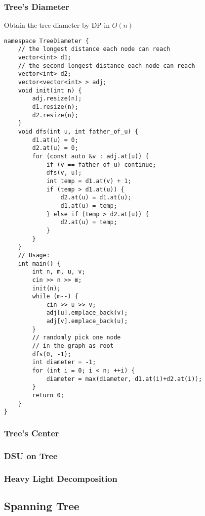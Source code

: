 \documentclass[10pt]{article}{\twocolumn}
\begin{document}
\subsubsection{Tree's Diameter}
Obtain the tree diameter by DP in $O(n)$
\begin{lstlisting}
namespace TreeDiameter {
    // the longest distance each node can reach
    vector<int> d1;
    // the second longest distance each node can reach
    vector<int> d2;
    vector<vector<int> > adj;
    void init(int n) {
        adj.resize(n);
        d1.resize(n);
        d2.resize(n);
    }
    void dfs(int u, int father_of_u) {
        d1.at(u) = 0;
        d2.at(u) = 0;
        for (const auto &v : adj.at(u)) {
            if (v == father_of_u) continue;
            dfs(v, u);
            int temp = d1.at(v) + 1;
            if (temp > d1.at(u)) {
                d2.at(u) = d1.at(u);
                d1.at(u) = temp;
            } else if (temp > d2.at(u)) {
                d2.at(u) = temp;
            }
        }
    }
    // Usage:
    int main() {
        int n, m, u, v;
        cin >> n >> m;
        init(n);
        while (m--) {
            cin >> u >> v;
            adj[u].emplace_back(v);
            adj[v].emplace_back(u);
        }
        // randomly pick one node 
        // in the graph as root
        dfs(0, -1);
        int diameter = -1;
        for (int i = 0; i < n; ++i) {
            diameter = max(diameter, d1.at(i)+d2.at(i));
        }
        return 0;
    }
}
\end{lstlisting}

\subsubsection{Tree's Center}

\subsubsection{DSU on Tree}

\subsubsection{Heavy Light Decomposition}

\subsection{Spanning Tree}
\end{document}
